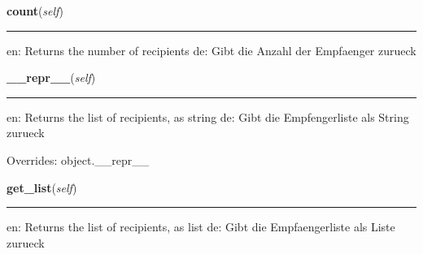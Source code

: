     \label{cuon:Email2:Recipients:count}

    \vspace{0.5ex}

\hspace{.8\funcindent}\begin{boxedminipage}{\funcwidth}

    \raggedright \textbf{count}(\textit{self})

    \vspace{-1.5ex}

    \rule{\textwidth}{0.5\fboxrule}
\setlength{\parskip}{2ex}
    en: Returns the number of recipients de: Gibt die Anzahl der Empfaenger
    zurueck

\setlength{\parskip}{1ex}
    \end{boxedminipage}

    \vspace{0.5ex}

\hspace{.8\funcindent}\begin{boxedminipage}{\funcwidth}

    \raggedright \textbf{\_\_repr\_\_}(\textit{self})

    \vspace{-1.5ex}

    \rule{\textwidth}{0.5\fboxrule}
\setlength{\parskip}{2ex}
    en: Returns the list of recipients, as string de: Gibt die 
    Empfengerliste als String zurueck

\setlength{\parskip}{1ex}
      Overrides: object.\_\_repr\_\_

    \end{boxedminipage}

    \label{cuon:Email2:Recipients:get_list}

    \vspace{0.5ex}

\hspace{.8\funcindent}\begin{boxedminipage}{\funcwidth}

    \raggedright \textbf{get\_list}(\textit{self})

    \vspace{-1.5ex}

    \rule{\textwidth}{0.5\fboxrule}
\setlength{\parskip}{2ex}
    en: Returns the list of recipients, as list de: Gibt die 
    Empfaengerliste als Liste zurueck

\setlength{\parskip}{1ex}
    \end{boxedminipage}


